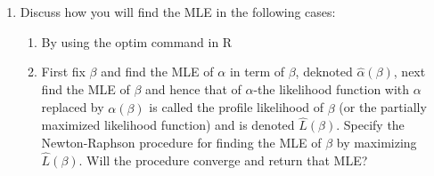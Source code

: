 \begin{enumerate}[resume]
    \item Discuss how you will find the MLE in the following cases: 
    \begin{enumerate}[label = (\alph*)]
        \item By using the optim command in R
        \item First fix $\beta$ and find the MLE of $\alpha$ in term of $\beta$, deknoted $\hat{\alpha}(\beta)$, next find the MLE of $\beta$ and hence that of $\alpha$-the likelihood function with $\alpha$ replaced by $\hat{\alpha(\beta)}$ is called the profile likelihood of $\beta$ (or the partially maximized likelihood function) and is denoted $\hat{L}(\beta)$. Specify the Newton-Raphson procedure for finding the MLE of $\beta$ by maximizing $\hat{L}(\beta)$. Will the procedure converge and return that MLE?
    \end{enumerate}
\end{enumerate}


